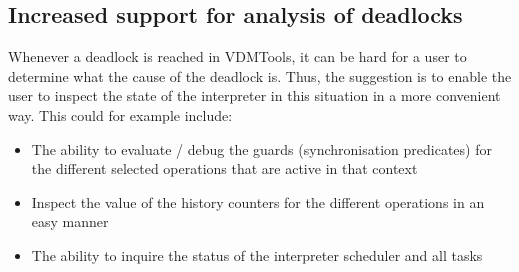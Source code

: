 \subsection{Increased support for analysis of deadlocks}

Whenever a deadlock is reached in VDMTools, it can be hard for a
user to determine what the cause of the deadlock is. Thus, the suggestion
is to enable the user to inspect the state of the interpreter in this
situation in a more convenient way. This could for example include:

\begin{itemize}
\item The ability to evaluate / debug the guards (synchronisation
predicates) for the different selected operations that are active in
that context
\item Inspect the value of the history counters for the different
operations in an easy manner
\item The ability to inquire the status of the interpreter scheduler
and all tasks
\end{itemize}


